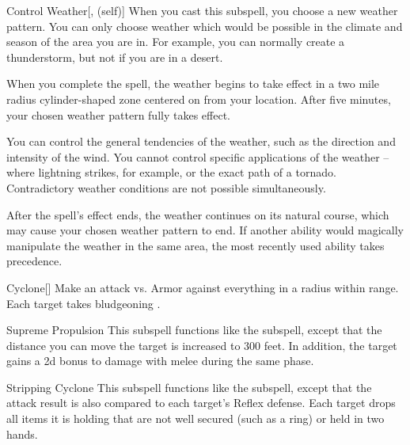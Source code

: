 \begin{ability}[\nth{4}]{Control Weather}[,  (self)]
When you cast this subspell, you choose a new weather pattern.
You can only choose weather which would be possible in the climate and season of the area you are in.
For example, you can normally create a thunderstorm, but not if you are in a desert.

When you complete the spell, the weather begins to take effect in a two mile radius cylinder-shaped zone centered on from your location.
After five minutes, your chosen weather pattern fully takes effect.

You can control the general tendencies of the weather, such as the direction and intensity of the wind.
You cannot control specific applications of the weather -- where lightning strikes, for example, or the exact path of a tornado.
Contradictory weather conditions are not possible simultaneously.

After the spell's effect ends, the weather continues on its natural course, which may cause your chosen weather pattern to end.
If another ability would magically manipulate the weather in the same area, the most recently used ability takes precedence.
\end{ability}
\vspace{0.25em}



\begin{ability}[\nth{4}]{Cyclone}[]
Make an attack vs. Armor against everything in a \areamed radius within \rngmed range.
\hit Each target takes bludgeoning .
\end{ability}
\vspace{0.25em}



\begin{ability}[\nth{4}]{Supreme Propulsion}
This subspell functions like the  subspell, except that the distance you can move the target is increased to 300 feet.
In addition, the target gains a \plus2d bonus to damage with melee  during the same phase.
\end{ability}
\vspace{0.25em}



\begin{ability}[\nth{6}]{Stripping Cyclone}
This subspell functions like the  subspell, except that the attack result is also compared to each target's Reflex defense.
\hit Each target drops all items it is holding that are not well secured (such as a ring) or held in two hands.
\end{ability}
\vspace{0.25em}


